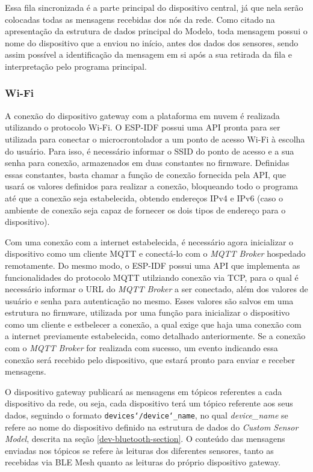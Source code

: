 \documentclass[../monografia.tex]{subfiles}
\begin{document}
Essa fila sincronizada é a parte principal do dispositivo central, já que nela serão colocadas todas as mensagens recebidas dos nós da rede. Como citado na apresentação da estrutura de dados principal do Modelo, toda mensagem possui o nome do dispositivo que a enviou no início, antes dos dados dos sensores, sendo assim possível a identificação da mensagem em si após a sua retirada da fila e interpretação pelo programa principal.


\subsubsection{Wi-Fi}

A conexão do dispositivo gateway com a plataforma em nuvem é realizada utilizando o protocolo Wi-Fi. O ESP-IDF possui uma API pronta para ser utilizada para conectar o microcrontolador a um ponto de acesso Wi-Fi à escolha do usuário. Para isso, é necessário informar o SSID do ponto de acesso e a sua senha para conexão, armazenados em duas constantes no firmware. Definidas essas constantes, basta chamar a função de conexão fornecida pela API, que usará os valores definidos para realizar a conexão, bloqueando todo o programa até que a conexão seja estabelecida, obtendo endereços IPv4 e IPv6 (caso o ambiente de conexão seja capaz de fornecer os dois tipos de endereço para o dispositivo).

Com uma conexão com a internet estabelecida, é necessário agora inicializar o dispositivo como um cliente MQTT e conectá-lo com o \textit{MQTT Broker} hospedado remotamente. Do mesmo modo, o ESP-IDF possui uma API que implementa as funcionalidades do protocolo MQTT utilziando conexão via TCP, para o qual é necessário informar o URL do \textit{MQTT Broker} a ser conectado, além dos valores de usuário e senha para autenticação no mesmo. Esses valores são salvos em uma estrutura no firmware, utilizada por uma função para inicializar o dispositivo como um cliente e estbelecer a conexão, a qual exige que haja uma conexão com a internet previamente estabelecida, como detalhado anteriormente. Se a conexão com o \textit{MQTT Broker} for realizada com sucesso, um evento indicando essa conexão será recebido pelo dispositivo, que estará pronto para enviar e receber mensagens.

O dispositivo gateway publicará as mensagens em tópicos referentes a cada dispositivo da rede, ou seja, cada dispositivo terá um tópico referente aos seus dados, seguindo o formato \texttt{devices\char`/device\char`_name}, no qual \textit{device\_name} se refere ao nome do dispositivo definido na estrutura de dados do \textit{Custom Sensor Model}, descrita na seção \ref{dev-bluetooth-section}. O conteúdo das mensagens enviadas nos tópicos se refere às leituras dos diferentes sensores, tanto as recebidas via BLE Mesh quanto as leituras do próprio dispositivo gateway.
\end{document}
